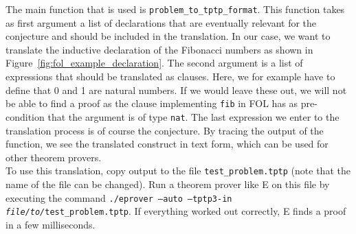 \documentclass[a4paper]{article}
\begin{document}
The main function that is used is \texttt{problem\_to\_tptp\_format}. This function takes as first argument a list of declarations that are eventually relevant for the conjecture and should be included in the translation. In our case, we want to translate the inductive declaration of the Fibonacci numbers as shown in Figure~\ref{fig:fol_example_declaration}. The second argument is a list of expressions that should be translated as clauses. Here, we for example have to define that 0 and 1 are natural numbers. If we would leave these out, we will not be able to find a proof as the clause implementing \texttt{fib} in FOL has as pre-condition that the argument is of type \texttt{nat}. The last expression we enter to the translation process is of course the conjecture. By tracing the output of the function, we see the translated construct in text form, which can be used for other theorem provers. \\

To use this translation, copy output to the file \texttt{test\_problem.tptp} (note that the name of the file can be changed).
Run a theorem prover like E \cite{EProver} on this file by executing the command \texttt{./eprover --auto --tptp3-in \textit{file/to/}test\_problem.tptp}. If everything worked out correctly, E finds a proof in a few milliseconds.
\end{document}
